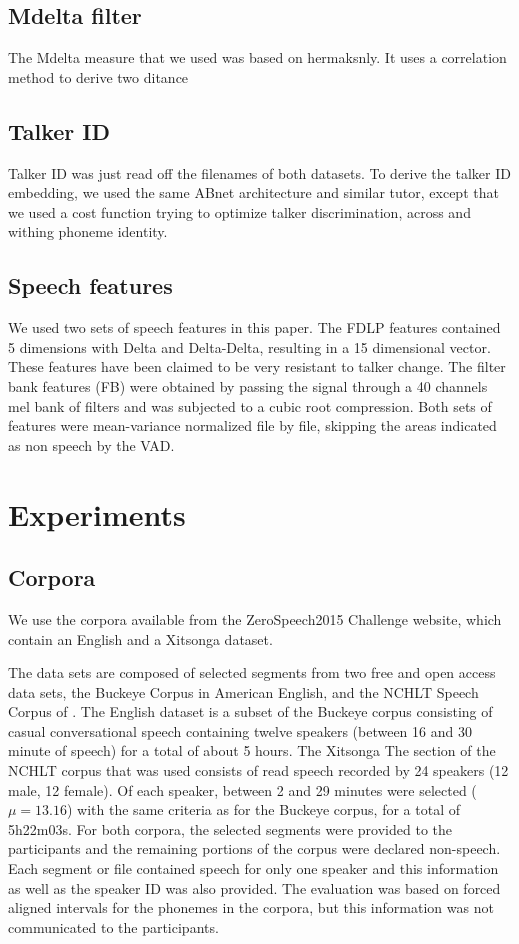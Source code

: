 \documentclass[a4paper]{article}
\begin{document}
\subsection{Mdelta filter}
The Mdelta measure that we used was based on hermaksnly. It uses a correlation method to derive two ditance

\subsection{Talker ID}
Talker ID was just read off the filenames of both datasets. To derive the talker ID embedding, we used the same ABnet architecture and similar tutor, except that we used a cost function trying to optimize talker discrimination, across and withing phoneme identity.

\subsection{Speech features}
We used two sets of speech features in this paper. The FDLP features contained 5 dimensions \cite{} with Delta and Delta-Delta, resulting in a 15 dimensional vector. These features have been claimed to be very resistant to talker change. The filter bank features (FB) were obtained by passing the signal through a 40 channels mel bank of filters and was subjected to a cubic root compression.  Both sets of features were mean-variance normalized file by file, skipping the areas indicated as non speech by the VAD. 

\section{Experiments}
\subsection{Corpora}
We use the corpora available from the ZeroSpeech2015 Challenge website, which contain an English and a Xitsonga dataset. 

The data sets are composed of selected segments from two free and open access data sets, the Buckeye Corpus  in American English, and the NCHLT Speech Corpus of . The English dataset is a subset of the Buckeye corpus \cite{buckeye} consisting of casual conversational speech containing twelve speakers (between 16 and 30 minute of speech) for a total of about 5 hours. The Xitsonga \cite{xitsonga2014}The section of the NCHLT corpus that was used consists of read speech recorded by 24 speakers (12 male, 12 female). Of each speaker, between 2 and 29 minutes were selected ($\mu=13.16$) with the same criteria as for the Buckeye corpus, for a total of 5h22m03s. For both corpora, the selected segments were provided to the participants and the remaining portions of the corpus were declared non-speech. Each segment or file contained speech for only one speaker and this information as well as the speaker ID was also provided. The evaluation was based on forced aligned intervals for the phonemes in the corpora, but this information was not communicated to the participants.
\end{document}
